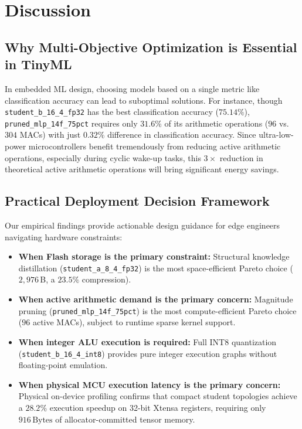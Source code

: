 \documentclass[journal,10pt]{IEEEtran}
\begin{document}
\section{Discussion}
\subsection{Why Multi-Objective Optimization is Essential in TinyML}
In embedded ML design, choosing models based on a single metric like classification accuracy can lead to suboptimal solutions. For instance, though \texttt{student\_b\_16\_4\_fp32} has the best classification accuracy ($75.14\%$), \texttt{pruned\_mlp\_14f\_75pct} requires only $31.6\%$ of its arithmetic operations ($96$ vs. $304$ MACs) with just $0.32\%$ difference in classification accuracy. Since ultra-low-power microcontrollers benefit tremendously from reducing active arithmetic operations, especially during cyclic wake-up tasks, this $3\times$ reduction in theoretical active arithmetic operations will bring significant energy savings.

\subsection{Practical Deployment Decision Framework}
Our empirical findings provide actionable design guidance for edge engineers navigating hardware constraints:
\begin{itemize}
    \item \textbf{When Flash storage is the primary constraint:} Structural knowledge distillation (\texttt{student\_a\_8\_4\_fp32}) is the most space-efficient Pareto choice ($2,976$\,B, a $23.5\%$ compression).
    \item \textbf{When active arithmetic demand is the primary concern:} Magnitude pruning (\texttt{pruned\_mlp\_14f\_75pct}) is the most compute-efficient Pareto choice ($96$ active MACs), subject to runtime sparse kernel support.
    \item \textbf{When integer ALU execution is required:} Full INT8 quantization (\texttt{student\_b\_16\_4\_int8}) provides pure integer execution graphs without floating-point emulation.
    \item \textbf{When physical MCU execution latency is the primary concern:} Physical on-device profiling confirms that compact student topologies achieve a $28.2\%$ execution speedup on 32-bit Xtensa registers, requiring only $916\,\text{Bytes}$ of allocator-committed tensor memory.
\end{itemize}
\end{document}
